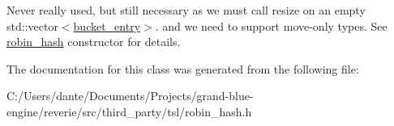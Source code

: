 Never really used, but still necessary as we must call resize on an empty {\ttfamily std\+::vector$<$\mbox{\hyperlink{classtsl_1_1detail__robin__hash_1_1bucket__entry}{bucket\+\_\+entry}}$>$}. and we need to support move-\/only types. See \mbox{\hyperlink{classtsl_1_1detail__robin__hash_1_1robin__hash}{robin\+\_\+hash}} constructor for details. 

The documentation for this class was generated from the following file\+:\begin{DoxyCompactItemize}
\item 
C\+:/\+Users/dante/\+Documents/\+Projects/grand-\/blue-\/engine/reverie/src/third\+\_\+party/tsl/robin\+\_\+hash.\+h\end{DoxyCompactItemize}
